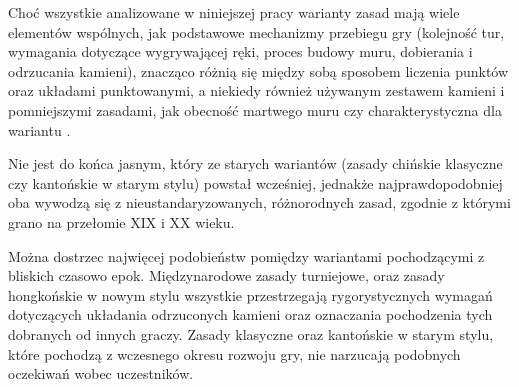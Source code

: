 Choć wszystkie analizowane w niniejszej pracy warianty zasad mają wiele
elementów wspólnych, jak podstawowe mechanizmy przebiegu gry (kolejność tur,
wymagania dotyczące wygrywającej ręki, proces budowy muru, dobierania i
odrzucania kamieni), znacząco różnią się między sobą sposobem liczenia punktów
oraz układami punktowanymi, a niekiedy również używanym zestawem kamieni i
pomniejszymi zasadami, jak obecność martwego muru czy charakterystyczna dla
wariantu  .

Nie jest do końca jasnym, który ze starych wariantów (zasady chińskie klasyczne
czy kantońskie w starym stylu) powstał wcześniej, jednakże najprawdopodobniej
oba wywodzą się z nieustandaryzowanych, różnorodnych zasad, zgodnie z którymi
grano na przełomie XIX i XX wieku.

Można dostrzec najwięcej podobieństw pomiędzy wariantami pochodzącymi z bliskich
czasowo epok. Międzynarodowe zasady turniejowe,  oraz zasady
hongkońskie w nowym stylu wszystkie przestrzegają rygorystycznych wymagań
dotyczących układania odrzuconych kamieni oraz oznaczania pochodzenia
tych dobranych od innych graczy. Zasady klasyczne oraz kantońskie w starym
stylu, które pochodzą z wczesnego okresu rozwoju gry, nie narzucają podobnych
oczekiwań wobec uczestników.
